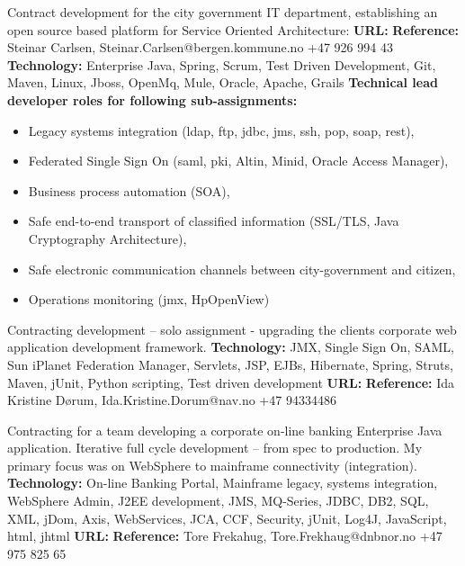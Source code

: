 \documentclass[11pt,a4paper,sans]{moderncv} %
\begin{document}
\pagebreak

{
Contract development for the city government IT department, establishing an open source based platform for Service Oriented Architecture:
\newline{}\textbf{URL:} 
\newline{}\textbf{Reference:} Steinar Carlsen,  Steinar.Carlsen@bergen.kommune.no +47 926 994 43
\newline{}\textbf{Technology:} Enterprise Java, Spring,  Scrum, Test Driven Development, Git, Maven,  Linux,  Jboss, OpenMq,  Mule,  Oracle, Apache,  Grails
\newline{}\textbf{Technical lead developer roles for following  sub-assignments:}
\begin{itemize}
\item Legacy systems integration (ldap, ftp, jdbc, jms, ssh, pop, soap, rest),
\item Federated Single Sign On (saml, pki, Altin, Minid, Oracle Access Manager),
\item Business process automation (SOA),
\item Safe end-to-end transport of classified information (SSL/TLS, Java Cryptography Architecture),
\item Safe electronic communication channels between city-government and citizen,
\item Operations monitoring (jmx, HpOpenView)
\end{itemize}
}

{
Contracting  development – solo assignment - upgrading the clients corporate web application development framework.
\newline{}\textbf{Technology:} JMX, Single Sign On, SAML, Sun iPlanet Federation Manager, Servlets, JSP, EJBs, Hibernate, Spring, Struts, Maven, jUnit, Python scripting, Test driven development
\newline{}\textbf{URL:} 
\newline{}\textbf{Reference:} Ida Kristine Dørum, Ida.Kristine.Dorum@nav.no +47 94334486
}

{
Contracting for a team  developing  a corporate on-line banking Enterprise Java application.
Iterative full cycle development – from spec to production. My primary	focus was on WebSphere to mainframe connectivity (integration).
\newline{}\textbf{Technology:} On-line Banking Portal, Mainframe legacy, systems integration, WebSphere Admin, J2EE development, JMS, MQ-Series, JDBC, DB2, SQL, XML, jDom, Axis, WebServices, JCA, CCF, Security, jUnit, Log4J, JavaScript, html, jhtml
\newline{}\textbf{URL:} 
\newline{}\textbf{Reference:} Tore Frekahug, Tore.Frekhaug@dnbnor.no +47 975 825 65
}
\end{document}
